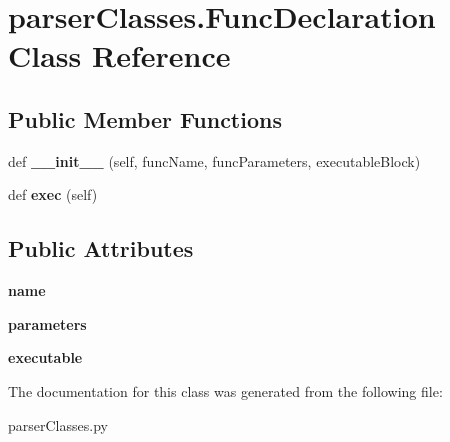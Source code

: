\hypertarget{classparser_classes_1_1_func_declaration}{}\section{parser\+Classes.\+Func\+Declaration Class Reference}
\label{classparser_classes_1_1_func_declaration}
\subsection*{Public Member Functions}
\begin{DoxyCompactItemize}
\item 
\mbox{\label{classparser_classes_1_1_func_declaration_a50e9ecdc3fe856094568e57e1697fa0c}} 
def {\bfseries \+\_\+\+\_\+init\+\_\+\+\_\+} (self, func\+Name, func\+Parameters, executable\+Block)
\item 
\mbox{\label{classparser_classes_1_1_func_declaration_a8ced5ff33d2344764037ad60034e8021}} 
def {\bfseries exec} (self)
\end{DoxyCompactItemize}
\subsection*{Public Attributes}
\begin{DoxyCompactItemize}
\item 
\mbox{\label{classparser_classes_1_1_func_declaration_a0819b3ffd946ed4915fed296aab72177}} 
{\bfseries name}
\item 
\mbox{\label{classparser_classes_1_1_func_declaration_ae737822ca3c55f6bacf6985562e41d94}} 
{\bfseries parameters}
\item 
\mbox{\label{classparser_classes_1_1_func_declaration_a0b6e461c4b0fefe197311830468874fa}} 
{\bfseries executable}
\end{DoxyCompactItemize}


The documentation for this class was generated from the following file\+:\begin{DoxyCompactItemize}
\item 
parser\+Classes.\+py\end{DoxyCompactItemize}
